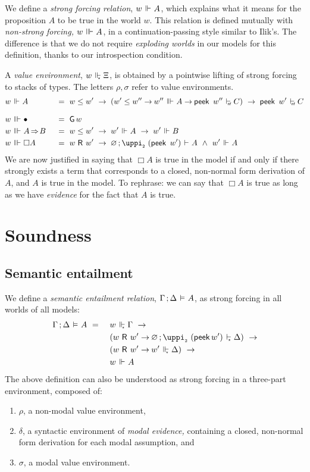 \documentclass[submission,copyright,creativecommons,sharealike,backref=page]{eptcs}
\newcommand{\R}{\mathrel{\rlap{$\mkern.75mu\textsf{R}$}\hphantom{\subseteq}}}
\renewcommand{\:}{\mathop{\mkern3mu:\mkern3mu}}
\renewcommand{\.}{\mathop{\mkern3mu.\mkern3mu}}
\renewcommand{\;}{\mathop{;}}
\renewcommand{\,}{\mathop{,}}
\newcommand{\conj}{\mathrel{\wedge}}
\newcommand{\e}{\mathrel{\mkern2mu\vdash\mkern1mu}}
\newcommand{\enf}{\mathrel{\mkern2mu\vdash_{\mkern-9mu\scriptscriptstyle{\textsf{nf}}}}}
\newcommand{\es}{\mathrel{\mkern2mu\vdash_{\mkern-9mu\scriptscriptstyle{\star}}}}
\newcommand{\ee}{\mathrel{\mkern2mu\Vdash\mkern1mu}}
\newcommand{\ees}{\mathrel{\mkern2mu\Vdash_{\mkern-9mu\scriptscriptstyle{\star}}}}
\newcommand{\eee}{\mathrel{\mkern2mu\Vvdash\mkern1mu}}
\newcommand{\ef}{\mathrel{\mkern2mu\vDash\mkern1mu}}
\renewcommand{\r}{\mathrel{\rightarrow\mkern-1mu}}
\newcommand{\rf}{\mathop{\Rightarrow\mkern-1mu}}
\newcommand{\peek}{\operatorname{\textsf{peek}}}
\newcommand{\piii}{\operatorname{\uppi_{\scriptscriptstyle{2}}}}
\newcommand{\G}{\operatorname{\textsf{G}}}
\newcommand{\base}{\mathop{\bullet}}
\renewcommand{\O}{\varnothing}
\theoremstyle{mystyle}
\begin{document}
We define a \emph{strong forcing relation}, $w \ee A$, which explains what it means for the proposition $A$ to be true in the world $w$.  This relation is defined mutually with \emph{non-strong forcing,} $w \eee A$, in a continuation-passing style similar to Ilik's.  The difference is that we do not require \emph{exploding worlds} in our models for this definition, thanks to our introspection condition.

A \emph{value environment}, $w \ees \Xi$, is obtained by a pointwise lifting of strong forcing to stacks of types.  The letters $\rho, \sigma$ refer to value environments.
\begin{alignat*}{2}
  & w \ee A        && ~=~ w \le w' ~\r~ (w' \le w'' \r w'' \eee A \r \peek~w'' \enf C) ~\r~ \peek~w' \enf C\\[.5\baselineskip]
  & w \eee \base   && ~=~ \G w\\
  & w \eee A \rf B && ~=~ w \le w' ~\r~ w' \ee A ~\r~ w' \ee B\\
  & w \eee \Box A  && ~=~ w \R w' ~\r~ \O \; \piii~(\peek~w') \e A~\conj~w' \ee A
\end{alignat*}
We are now justified in saying that $\Box A$ is true in the model if and only if there strongly exists a term that corresponds to a closed, non-normal form derivation of $A$, and $A$ is true in the model.  To rephrase: we can say that $\Box A$ is true as long as we have \emph{evidence} for the fact that $A$ is true.


\section{Soundness}\label{Soundness}

\subsection{Semantic entailment}

We define a \emph{semantic entailment relation}, $\Gamma \; \Delta \ef A$, as strong forcing in all worlds of all models:
\begin{alignat*}{2}
  & \Gamma \; \Delta \ef A ~=~ && w \ees \Gamma ~\r\\
  &                            && (w \R w' \r \O \; \piii~(\peek w') \es \Delta) ~\r\\
  &                            && (w \R w' \r w' \ees \Delta) ~\r\\
  &                            && w \ee A
\end{alignat*}
The above definition can also be understood as strong forcing in a three-part environment, composed of:
\begin{enumerate}
  \item $\rho$, a non-modal value environment,
  \item $\delta$, a syntactic environment of \emph{modal evidence,} containing a closed, non-normal form derivation for each modal assumption, and
  \item $\sigma$, a modal value environment.
\end{enumerate}
\end{document}
